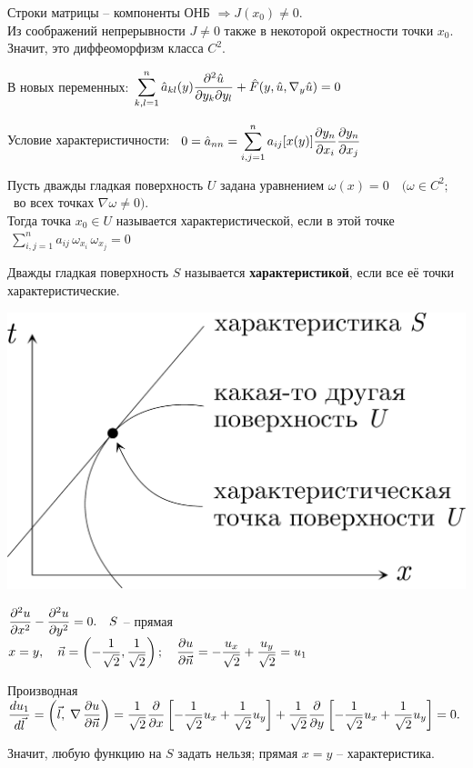 \documentclass[../main.tex]{subfiles}
\begin{document}
Строки матрицы -- компоненты ОНБ $\Rightarrow J(x_0)\neq 0$.\\
Из соображений непрерывности $J \neq 0$ также в некоторой окрестности точки $x_0$.\\
Значит, это диффеоморфизм класса $C^2$.

В новых переменных: $\displaystyle\sum_{k,l=1}^n
\hat{a}_{kl}(y) \dfrac{\partial^2 \hat{u}}{\partial y_k\partial y_l}
+ \hat{F} (y, \hat{u}, \nabla_y \hat{u}) = 0$

Условие характеристичности: \ $\displaystyle 0 = \hat{a}_{nn} = \sum\limits_{i,j=1}^{n} a_{ij}[x(y)]\dfrac{\partial y_n}{\partial x_i}\dfrac{\partial y_n}{\partial x_j}$

\begin{definition}
    Пусть дважды гладкая поверхность $U$ задана уравнением $\omega(x) = 0\quad (\omega \in C^2;$ \ во всех точках $\nabla\omega \neq 0).$\\
    Тогда точка $x_0 \in U$ называется характеристической, если в этой точке $\ \displaystyle\sum\limits_{i,j=1}^{n} a_{ij}\, \omega_{x_i}\, \omega_{x_j} = 0$
\end{definition}

\begin{definition}
    Дважды гладкая поверхность $S$ называется {\bf характеристикой}, если все её точки характеристические.
\end{definition}
\begin{center}
    \includegraphics[height=0.22\textwidth]{./pic 2_2.pdf}
\end{center}
\begin{example}
$\dfrac{\partial^{2} u}{\partial x^{2}} - \dfrac{\partial^{2} u}{\partial y^{2}} = 0.\quad S$ -- прямая $x=y, \quad \vec{n} = \left(-\dfrac1{\sqrt{2}}, \dfrac1{\sqrt{2}}\right);\quad \dfrac{\partial u}{\partial \vec{n}} = -\dfrac{u_x}{\sqrt2} + \dfrac{u_y}{\sqrt2} = u_1$

Производная $\dfrac{du_1}{d\vec l} = \left(\vec{l},\; \nabla\,\dfrac{\partial u}{\partial \vec{n}}\right) = \dfrac1{\sqrt{2}}\dfrac{\partial }{\partial x}\left[-\dfrac1{\sqrt2}u_x + \dfrac1{\sqrt{2}}u_y\right] + \dfrac1{\sqrt{2}}\dfrac{\partial }{\partial y}\left[-\dfrac1{\sqrt2}u_x + \dfrac1{\sqrt{2}}u_y\right] = 0.$

Значит, любую функцию на $S$ задать нельзя; прямая $x=y$ -- характеристика.
\end{example}
\vspace{5pt}
\end{document}
